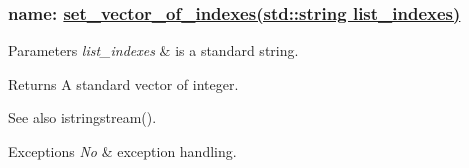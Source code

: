 \subsubsection*{name\+: \hyperlink{group__group__set_ga509b0f655b4883bbf55b97bf71bf177b}{set\+\_\+vector\+\_\+of\+\_\+indexes(std\+::string list\+\_\+indexes)}}


\begin{DoxyParams}{Parameters}
{\em list\+\_\+indexes} & is a standard string. \\
\hline
\end{DoxyParams}
\begin{DoxyReturn}{Returns}
A standard vector of integer. 
\end{DoxyReturn}
\begin{DoxySeeAlso}{See also}
istringstream(). 
\end{DoxySeeAlso}

\begin{DoxyExceptions}{Exceptions}
{\em No} & exception handling. \\
\hline
\end{DoxyExceptions}
